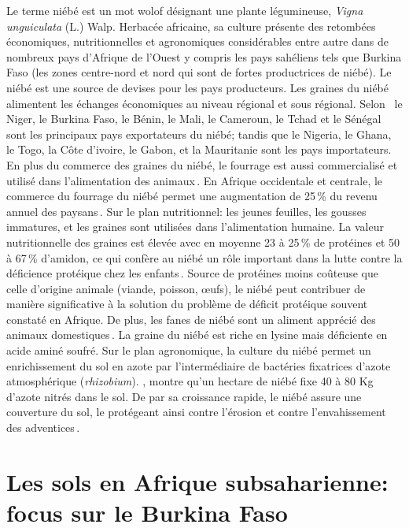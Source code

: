 \documentclass[a4paper,11pt]{article}
\begin{document}
Le terme niébé est un mot wolof désignant une plante légumineuse,
\emph{Vigna unguiculata} (L.) Walp. Herbacée africaine, sa culture
présente des retombées économiques, nutritionnelles et agronomiques
considérables entre autre dans de nombreux pays d'Afrique de l'Ouest y
compris les pays sahéliens tels que Burkina Faso (les zones
centre-nord et nord qui sont de fortes productrices de niébé).  Le
niébé est une source de devises pour les pays producteurs. Les graines
du niébé alimentent les échanges économiques au niveau régional et
sous régional. Selon
\citeauthor{Langyintuo_2003}\,\citeyear{Langyintuo_2003} le Niger, le
Burkina Faso, le Bénin, le Mali, le Cameroun, le Tchad et le Sénégal
sont les principaux pays exportateurs du niébé; tandis que le Nigeria,
le Ghana, le Togo, la Côte d’ivoire, le Gabon, et la Mauritanie sont
les pays importateurs. En plus du commerce des graines du niébé, le
fourrage est aussi commercialisé et utilisé dans l’alimentation des
animaux\,\cite{Langyintuo_2003}. En Afrique occidentale et centrale,
le commerce du fourrage du niébé permet une augmentation de 25\,\% du
revenu annuel des paysans\,\cite{Quin_1997}. Sur le plan nutritionnel:
les jeunes feuilles, les gousses immatures, et les graines sont
utilisées dans l’alimentation humaine. La valeur nutritionnelle des
graines est élevée avec en moyenne 23 à 25\,\% de protéines et 50 à
67\,\% d’amidon, ce qui confère au niébé un rôle important dans la
lutte contre la déficience protéique chez les
enfants\,\cite{Quin_1997}. Source de protéines moins coûteuse que
celle d’origine animale (viande, poisson, œufs), le niébé peut
contribuer de manière significative à la solution du problème de
déficit protéique souvent constaté en Afrique. De plus, les fanes de
niébé sont un aliment apprécié des animaux
domestiques\,\cite{BAMBARA_2008}. La graine du niébé est riche en
lysine mais déficiente en acide aminé soufré. Sur le plan agronomique,
la culture du niébé permet un enrichissement du sol en azote par
l’intermédiaire de bactéries fixatrices d’azote atmosphérique
(\emph{rhizobium}). \citeauthor{Quin_1997}\citeyear{Quin_1997}, montre qu’un
hectare de niébé fixe 40 à 80 Kg d’azote nitrés dans le sol. De par sa
croissance rapide, le niébé assure une couverture du sol, le protégeant
ainsi contre l’érosion et contre l’envahissement des
adventices\,\cite{Sawadogo_2009}.

\section{Les sols en Afrique subsaharienne: focus sur le Burkina Faso}
\end{document}

